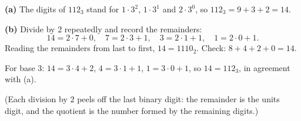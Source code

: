 \textbf{(a)} The digits of $112_3$ stand for $1\cdot3^2$, $1\cdot3^1$ and $2\cdot3^0$, so $112_3=9+3+2=\boxed{14}$.

\textbf{(b)} Divide by $2$ repeatedly and record the remainders:
\[14=2\cdot7+0,\quad 7=2\cdot3+1,\quad 3=2\cdot1+1,\quad 1=2\cdot0+1.\]
Reading the remainders from last to first, $14=\boxed{1110_2}$. Check: $8+4+2+0=14$.

For base $3$: $14=3\cdot4+2$, $4=3\cdot1+1$, $1=3\cdot0+1$, so $14=\boxed{112_3}$, in agreement with (a).

(Each division by $2$ peels off the last binary digit: the remainder is the units digit, and the quotient is the number formed by the remaining digits.)
